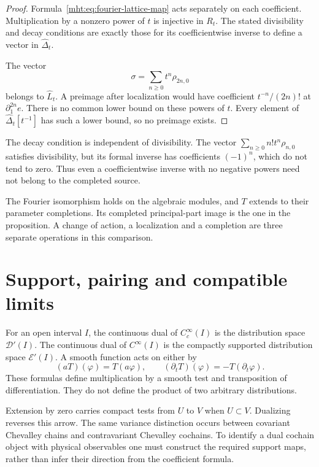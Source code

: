 \begin{proof}
Formula~\eqref{mht:eq:fourier-lattice-map} acts separately
on each coefficient. Multiplication by a nonzero power of $t$
is injective in $R_t$. The stated divisibility and decay
conditions are exactly those for its coefficientwise inverse
to define a vector in $\widehat\Delta_t$.

The vector
\[
 \sigma=\sum_{n\geq0}t^n\rho_{2n,0}
\]
belongs to $\widehat L_t$. A preimage after localization would
have coefficient $t^{-n}/(2n)!$ at $\partial_1^{2n}e$.
There is no common lower bound on these powers of $t$.
Every element of $\widehat\Delta_t[t^{-1}]$ has such a lower
bound, so no preimage exists.
\end{proof}

The decay condition is independent of divisibility. The vector
$\sum_{n\geq0}n!t^n\rho_{n,0}$ satisfies divisibility, but its
formal inverse has coefficients $(-1)^n$, which do not tend
to zero. Thus even a coefficientwise inverse with no negative
powers need not belong to the completed source.

The Fourier isomorphism holds on the algebraic modules,
and $T$ extends to their parameter completions. Its completed
principal-part image is the one in the proposition. A change
of action, a localization and a completion are three separate
operations in this comparison.

\section{Support, pairing and compatible limits}

For an open interval $I$, the continuous dual of
$C_c^\infty(I)$ is the distribution space $\mathcal D'(I)$.
The continuous dual of $C^\infty(I)$ is the compactly
supported distribution space $\mathcal E'(I)$. A smooth
function acts on either by
\[
 (aT)(\varphi)=T(a\varphi),\qquad
 (\partial_tT)(\varphi)=-T(\partial_t\varphi).
\]
These formulas define multiplication by a smooth test and
transposition of differentiation. They do not define the
product of two arbitrary distributions.

Extension by zero carries compact tests from $U$ to $V$ when
$U\subset V$. Dualizing reverses this arrow. The same variance
distinction occurs between covariant Chevalley chains and
contravariant Chevalley cochains. To identify a dual cochain
object with physical observables one must construct the
required support maps, rather than infer their direction
from the coefficient formula.

